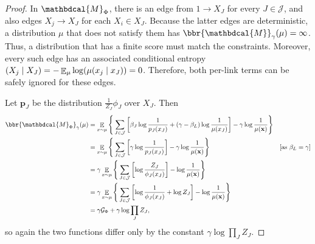 \documentclass{article}
\theoremstyle{plain}
\theoremstyle{definition}
\theoremstyle{remark}
\let\H\relax
\DeclareMathOperator{\H}{\mathrm{H}} %
\DeclareMathOperator*{\E}{\mathbb{E}} %
\newcommand\mat[1]{\mathbf{#1}}
\newcommand{\dg}[1]{\mathbdcal{#1}}
\newcommand{\PDGof}[1]{{\dg M}_{#1}}
\numberwithin{equation}{section}
\begin{document}
\begin{proof}
  In $\PDGof{\Phi}$, there is an edge from $1 \to X_J$ for every $J
  \in \mathcal J$, and also edges $X_j \to X_J$ for each $X_i
    \in X_J$. Because the latter edges are deterministic, a
        distribution $\mu$ that does not satisfy them has $\bbr{\dg
M}_\gamma(\mu) = \infty$. 
          Thus, a distribution that 
        has a finite score must match the constraints. Moreover, every
        such edge has an associated conditional entropy $\H(X_j \mid
        X_J) = -\E_\mu\log(\mu(x_j \mid x_J)) = 0$. Therefore, both
        per-link terms can be safely ignored for these edges. 

	Let $\mat p_J$ be the distribution $\frac{1}{Z_J}\phi_J$
        over $X_J$. 
        Then
	\begin{align*}
	\bbr{\PDGof{\Phi}}_\gamma(\mu) &= \E_{ x \sim \mu} \Bigg\{   \sum_{ J \in \mathcal J } \left[
		\beta_J \log \frac{1}{ p_J(x_J) } + (\gamma - \beta_L ) \log \frac{1}{\mu(x_J)} \right] - \gamma \log \frac{1}{\mu(\mat x)} \Bigg\} \\
		&= \E_{ x \sim \mu} \Bigg\{  \sum_{ J \in \mathcal J }\left[
			\gamma \log \frac{1}{p_J(x_J)}  \right] - \gamma \log \frac{1}{\mu(\mat x)} \Bigg\} 
					&\text{[as $\beta_L = \gamma$]}\\
		&= \gamma \E_{x \sim \mu} \Bigg\{  \sum_{ J \in \mathcal J } \left[
			\log \frac{Z_J}{\phi_J(x_J)}  \right] -\log \frac{1}{\mu(\mat x)} \Bigg\} \\
		&= \gamma \E_{x \sim \mu} \Bigg\{  \sum_{ J \in \mathcal J } \left[
			\log \frac{1}{\phi_J(x_J)} + \log Z_J \right]  - \log \frac{1}{\mu(\mat x)} \Bigg\} \\
        	&= \gamma \mathcal G_{\Phi} + \gamma \log \prod_{J} Z_J,
	\end{align*}
 so again the two functions differ only by the constant
        $\gamma \log \prod_{J} Z_J$. 
\end{proof}
\end{document}
